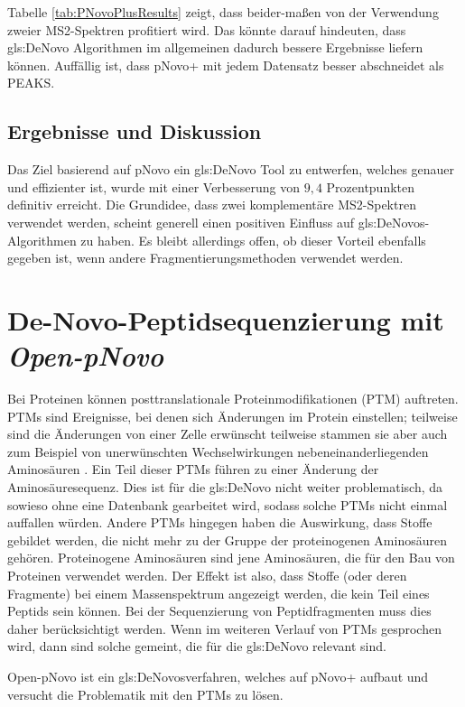\documentclass[a4paper, 12pt]{article}
\newcommand{\dashAndSpace}{\textendash \space}
\begin{document}
Tabelle \ref{tab:PNovoPlusResults} zeigt, dass beider-maßen von der Verwendung zweier MS2-Spektren profitiert wird. Das könnte darauf hindeuten, dass \gls{gls:DeNovo} Algorithmen im allgemeinen dadurch bessere Ergebnisse liefern können. Auffällig ist, dass pNovo+ mit jedem Datensatz besser abschneidet als PEAKS.

\subsection{Ergebnisse und Diskussion}
Das Ziel basierend auf pNovo ein \gls{gls:DeNovo} Tool zu entwerfen, welches genauer und effizienter ist, wurde mit einer Verbesserung von $ 9,4 $ Prozentpunkten definitiv erreicht. Die Grundidee, dass zwei komplementäre MS2-Spektren verwendet werden, scheint generell einen positiven Einfluss auf \gls{gls:DeNovo}s-Algorithmen zu haben. Es bleibt allerdings offen, ob dieser Vorteil ebenfalls gegeben ist, wenn andere Fragmentierungsmethoden verwendet werden.



\section{De-Novo-Peptidsequenzierung mit \emph{Open-pNovo}}\label{s:OpenpNovoSeq}
Bei Proteinen können posttranslationale Proteinmodifikationen (PTM) auftreten. PTMs sind Ereignisse, bei denen sich Änderungen im Protein einstellen; teilweise sind die Änderungen von einer Zelle erwünscht \dashAndSpace teilweise stammen sie aber auch zum Beispiel von unerwünschten Wechselwirkungen nebeneinanderliegenden Aminosäuren \cite[256]{Mann2003}. Ein Teil dieser PTMs führen zu einer Änderung der Aminosäuresequenz. Dies ist für die \gls{gls:DeNovo} nicht weiter problematisch, da sowieso ohne eine Datenbank gearbeitet wird, sodass solche PTMs nicht einmal auffallen würden. Andere PTMs hingegen haben die Auswirkung, dass Stoffe gebildet werden, die nicht mehr zu der Gruppe der proteinogenen Aminosäuren gehören. Proteinogene Aminosäuren sind jene Aminosäuren, die für den Bau von Proteinen verwendet werden. Der Effekt ist also, dass Stoffe (oder deren Fragmente) bei einem Massenspektrum angezeigt werden, die kein Teil eines Peptids sein können. Bei der Sequenzierung von Peptidfragmenten muss dies daher berücksichtigt werden. Wenn im weiteren Verlauf von PTMs gesprochen wird, dann sind solche gemeint, die für die \gls{gls:DeNovo} relevant sind.

Open-pNovo ist ein \gls{gls:DeNovo}sverfahren, welches auf pNovo+ aufbaut und versucht die Problematik mit den PTMs zu lösen.
\end{document}
